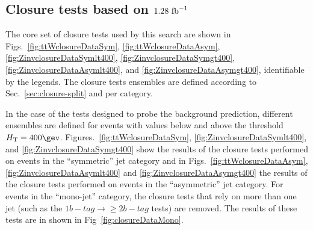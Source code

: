 
\subsection{Closure tests based on $1.28~\text{fb}^{-1}$}
\label{sec:closure-tests-data}

The core set of closure tests used by this search are shown in
Figs.~\ref{fig:ttWclosureDataSym}, \ref{fig:ttWclosureDataAsym},
\ref{fig:ZinvclosureDataSymlt400}, \ref{fig:ZinvclosureDataSymgt400},
\ref{fig:ZinvclosureDataAsymlt400}, and
\ref{fig:ZinvclosureDataAsymgt400}, identifiable by the legends. The
closure tests ensembles are defined according to
Sec.~\ref{sec:closure-split} and per \njet category. 

In the case of the tests designed to probe the \znunu background
prediction, different ensembles are defined for events with values
below and above the threshold $\scalht=400\gev$. 
Figures.~\ref{fig:ttWclosureDataSym},
\ref{fig:ZinvclosureDataSymlt400}, and
\ref{fig:ZinvclosureDataSymgt400} show the results of the closure
tests performed on events in the ``symmetric'' jet category and in
Figs.~\ref{fig:ttWclosureDataAsym}, \ref{fig:ZinvclosureDataAsymlt400}
and \ref{fig:ZinvclosureDataAsymgt400} the results of the closure
tests performed on events in the ``asymmetric'' jet category. For
events in the ``mono-jet'' category, the closure tests that rely on
more than one jet (such as the $1 b-tag\rightarrow\geq 2 b-tag$ tests)
are removed. The results of these tests are in shown in
Fig~\ref{fig:closureDataMono}.


